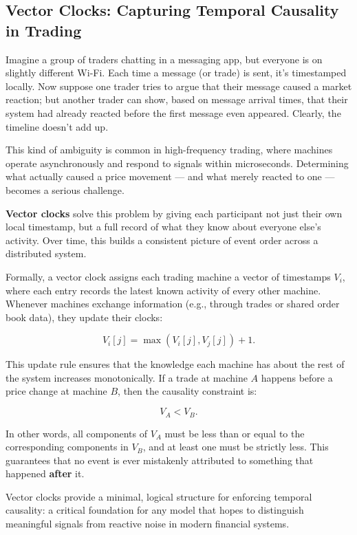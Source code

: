 \subsection{Vector Clocks: Capturing Temporal Causality in Trading}

\vspace{0.5em}
\noindent
Imagine a group of traders chatting in a messaging app, but everyone is on slightly different Wi-Fi. Each time a message (or trade) is sent, it’s timestamped locally. Now suppose one trader tries to argue that their message caused a market reaction; but another trader can show, based on message arrival times, that their system had already reacted before the first message even appeared. Clearly, the timeline doesn’t add up.

This kind of ambiguity is common in high-frequency trading, where machines operate asynchronously and respond to signals within microseconds. Determining what actually caused a price movement — and what merely reacted to one — becomes a serious challenge.

\textbf{Vector clocks} solve this problem by giving each participant not just their own local timestamp, but a full record of what they know about everyone else’s activity. Over time, this builds a consistent picture of event order across a distributed system.

\vspace{1em}
Formally, a vector clock assigns each trading machine a vector of timestamps \( V_i \), where each entry records the latest known activity of every other machine. Whenever machines exchange information (e.g., through trades or shared order book data), they update their clocks:

\[
V_i[j] = \max(V_i[j], V_j[j]) + 1.
\]

This update rule ensures that the knowledge each machine has about the rest of the system increases monotonically. If a trade at machine \( A \) happens before a price change at machine \( B \), then the causality constraint is:

\[
V_A < V_B.
\]

In other words, all components of \( V_A \) must be less than or equal to the corresponding components in \( V_B \), and at least one must be strictly less. This guarantees that no event is ever mistakenly attributed to something that happened \textbf{after} it.

Vector clocks provide a minimal, logical structure for enforcing temporal causality: a critical foundation for any model that hopes to distinguish meaningful signals from reactive noise in modern financial systems.

